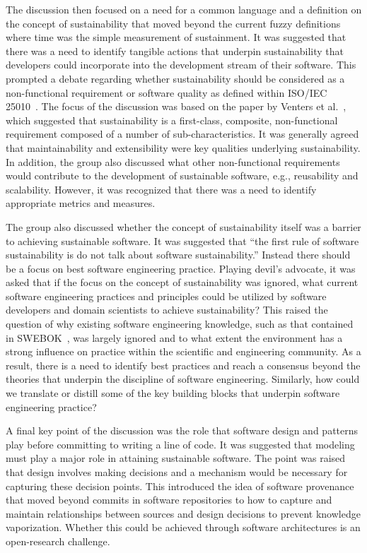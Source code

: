 \documentclass[11pt, oneside]{amsart}
\begin{document}
The discussion then focused on a need for a common language and a definition on
the concept of sustainability that moved beyond the current fuzzy definitions
where time was the simple measurement of sustainment. It was suggested that
there was a need to identify tangible actions that underpin sustainability that
developers could incorporate into the development stream of their software. This
prompted a debate regarding whether sustainability should be considered as a
non-functional requirement or software quality as defined within ISO/IEC
25010~\cite{iso25010}. The focus of the discussion was based on the paper by
Venters et al.~\cite{wssspe2_venters}, which suggested that sustainability is a
first-class, composite, non-functional requirement composed of a number of
sub-characteristics. It was generally agreed that maintainability and
extensibility were key qualities underlying sustainability. In addition, the
group also discussed what other non-functional requirements would contribute to
the development of sustainable software, e.g., reusability and scalability.
However, it was recognized that there was a need to identify appropriate metrics
and measures.

The group also discussed whether the concept of sustainability itself was a
barrier to achieving sustainable software. It was suggested that ``the first
rule of software sustainability is do not talk about software
sustainability.'' Instead there should be a focus on best software engineering
practice. Playing devil's advocate, it was asked that if the focus on the
concept of sustainability was ignored, what current software engineering
practices and principles could be utilized by software developers and domain
scientists to achieve sustainability? This raised the question of why existing
software engineering knowledge, such as that contained in
SWEBOK~\cite{Bourque2014}, was largely ignored and to what extent the
environment has a strong influence on practice within the scientific and
engineering community. As a result, there is a need to identify best practices
and reach a consensus beyond the theories that underpin the discipline of
software engineering. Similarly, how could we translate or distill some of the
key building blocks that underpin software engineering practice?

A final key point of the discussion was the role that software design and
patterns play before committing to writing a line of code. It was suggested that
modeling must play a major role in attaining sustainable software. The point was
raised that design involves making decisions and a mechanism would be necessary
for capturing these decision points. This introduced the idea of software
provenance that moved beyond commits in software repositories to how to capture
and maintain relationships between sources and design decisions to prevent
knowledge vaporization. Whether this could be achieved through software
architectures is an open-research challenge.
\end{document}
